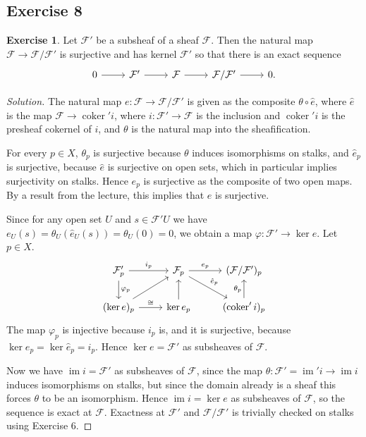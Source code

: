 \documentclass[a4paper]{amsbook}
\theoremstyle{definition}
\newtheorem*{exercise*}{Exercise}
\DeclareMathOperator\coker{coker}
\DeclareMathOperator\im{im}
\begin{document}
\subsection*{Exercise 8}
\label{Ex8}
\begin{exercise*}
\label{First}
Let $\mathcal{F}'$ be a subsheaf of a sheaf $\mathcal{F}$. Then the
natural map $\mathcal{F}\to \mathcal{F}/\mathcal{F}'$ is surjective and has
kernel $\mathcal{F}'$ so that there is an exact sequence
\[\begin{tikzcd}
0 \arrow[r] & \mathcal{F}' \arrow[r] & \mathcal{F} \arrow[r] & \mathcal{F}/\mathcal{F}' \arrow[r] & 0.
\end{tikzcd}\]
\end{exercise*}
\begin{proof}[Solution]
The natural map $e\colon \mathcal{F}\to \mathcal{F}/\mathcal{F}'$ is
given as the composite $\theta \circ \hat{e}$, where $\hat{e}$ is
the map $\mathcal{F}\to \coker' i$, where $i\colon \mathcal{F}'\to \mathcal{F}$ is
the inclusion and $\coker' i$ is the presheaf cokernel of $i$, and
$\theta$ is the natural map into the sheafification.

For every $p \in X$, $\theta_p$ is surjective because $\theta$ induces
isomorphisms on stalks, and $\hat{e}_p$ is surjective, because
$\hat{e}$ is surjective on open sets, which in particular implies
surjectivity on stalks. Hence $e_p$ is surjective as the composite
of two open maps. By a result from the lecture, this implies that $e$
is surjective.

Since for any open set $U$ and $s \in \mathcal{F}'U$ we have
$e_U(s) = \theta_U(\hat{e}_U(s)) = \theta_U(0) = 0$, we obtain a map
$\varphi\colon\mathcal{F}' \to \ker e$. Let $p \in X$.
\[\begin{tikzcd}
	\mathcal{F}_p'\ar[d, "\varphi_p"]\ar[r, "i_p"] & \mathcal{F}_p\ar[r, "e_p"]\ar[dr, "\hat{e}_p"] & (\mathcal{F}/\mathcal{F}')_p\\
	(\ker e)_p\ar[ur]\ar[r, "\cong"] & \ker e_p\ar[u] & (\coker' i)_p\ar[u, "\theta_p"]
\end{tikzcd}\]
The map $\varphi_p$ is injective because $i_p$ is, and it is surjective, because
$\ker e_p = \ker \hat{e}_p = i_p$. Hence $\ker e = \mathcal{F}'$ as subsheaves
of $\mathcal{F}$.

Now we have $\im i = \mathcal{F}'$ as subsheaves of $\mathcal{F}$, since
the map $\theta\colon \mathcal{F}' = \im' i \to \im i$ induces isomorphisms on
stalks, but since the domain already is a sheaf this forces $\theta$ to be an
isomorphism. Hence $\im i = \ker e$ as subsheaves of $\mathcal{F}$, so the sequence
is exact at $\mathcal{F}$.  Exactness at $\mathcal{F}'$ and
$\mathcal{F}/\mathcal{F}'$ is trivially checked on stalks using Exercise 6.
\end{proof}
\end{document}

